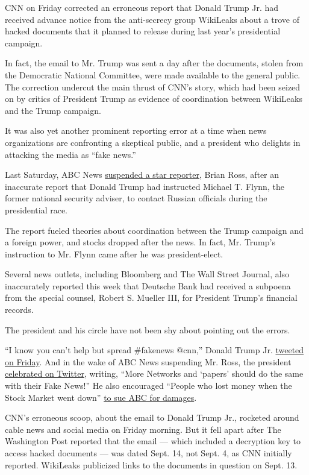 CNN on Friday corrected an erroneous report that Donald Trump Jr. had
received advance notice from the anti-secrecy group WikiLeaks about a
trove of hacked documents that it planned to release during last year's
presidential campaign.

In fact, the email to Mr. Trump was sent a day after the documents,
stolen from the Democratic National Committee, were made available to
the general public. The correction undercut the main thrust of CNN's
story, which had been seized on by critics of President Trump as
evidence of coordination between WikiLeaks and the Trump campaign.

It was also yet another prominent reporting error at a time when news
organizations are confronting a skeptical public, and a president who
delights in attacking the media as ``fake news.''

Last Saturday, ABC News
\href{https://www.nytimes3xbfgragh.onion/2017/12/02/us/brian-ross-suspended-abc.html}{suspended
a star reporter}, Brian Ross, after an inaccurate report that Donald
Trump had instructed Michael T. Flynn, the former national security
adviser, to contact Russian officials during the presidential race.

The report fueled theories about coordination between the Trump campaign
and a foreign power, and stocks dropped after the news. In fact, Mr.
Trump's instruction to Mr. Flynn came after he was president-elect.

Several news outlets, including Bloomberg and The Wall Street Journal,
also inaccurately reported this week that Deutsche Bank had received a
subpoena from the special counsel, Robert S. Mueller III, for President
Trump's financial records.

The president and his circle have not been shy about pointing out the
errors.

``I know you can't help but spread \#fakenews @cnn,'' Donald Trump Jr.
\href{https://twitter.com/DonaldJTrumpJr/status/939225658219118597}{tweeted
on Friday}. And in the wake of ABC News suspending Mr. Ross, the
president
\href{https://twitter.com/realDonaldTrump/status/937145025359761408}{celebrated
on Twitter}, writing, ``More Networks and `papers' should do the same
with their Fake News!'' He also encouraged ``People who lost money when
the Stock Market went down''
\href{https://twitter.com/realDonaldTrump/status/937145025359761408}{to
sue ABC for damages}.

CNN's erroneous scoop, about the email to Donald Trump Jr., rocketed
around cable news and social media on Friday morning. But it fell apart
after The Washington Post reported that the email --- which included a
decryption key to access hacked documents --- was dated Sept. 14, not
Sept. 4, as CNN initially reported. WikiLeaks publicized links to the
documents in question on Sept. 13.

